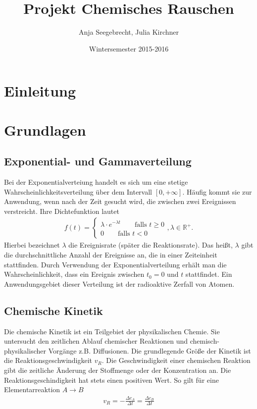 \documentclass{scrartcl}
\title{Projekt Chemisches Rauschen}
\author{Anja Seegebrecht, Julia Kirchner}
\date{Wintersemester 2015-2016}
\begin{document}
\maketitle

\newpage

\tableofcontents

\newpage

\section{Einleitung}


\section{Grundlagen}
\subsection{Exponential- und Gammaverteilung}
Bei der Exponentialverteiung handelt es sich um eine stetige Wahrscheinlichkeitsverteilung über dem Intervall $[0, +\infty]$. Häufig kommt sie zur Anwendung, wenn nach der Zeit gesucht wird, die zwischen zwei Ereignissen verstreicht.
Ihre Dichtefunktion lautet
\begin{align*}
    f(t) = \begin{cases} \lambda \cdot e^{-\lambda t} \qquad \text{falls } t \geq 0 \\ 0 \qquad \text{falls } t < 0 \end{cases}, \lambda \in \mathbb{R}^+.
\end{align*}
Hierbei bezeichnet $\lambda$ die Ereignisrate (später die Reaktionsrate). Das heißt, $\lambda$ gibt die durchschnittliche Anzahl der Ereignisse an, die in einer Zeiteinheit stattfinden. Durch Verwendung der Exponentialverteilung erhält man die Wahrscheinlichkeit, dass ein Ereignis zwischen $t_0=0$ und $t$ stattfindet. Ein Anwendungsgebiet dieser Verteilung ist der radioaktive Zerfall von Atomen. %
\subsection{Chemische Kinetik}
Die chemische Kinetik ist ein Teilgebiet der physikalischen Chemie. Sie untersucht den zeitlichen Ablauf chemischer Reaktionen und chemisch-physikalischer Vorgänge z.B. Diffusionen. Die grundlegende Größe der Kinetik ist die Reaktionsgeschwindigkeit $v_R$. Die Geschwindigkeit einer chemischen Reaktion gibt die zeitliche Änderung der Stoffmenge oder der Konzentration an.
Die Reaktionsgeschindigkeit hat stets einen positiven Wert.
So gilt für eine Elementarreaktion  $A \rightarrow B$
\begin{align*}
     v_R = - \frac{\Delta c_A}{\Delta t} = \frac{\Delta c_B}{\Delta t}
\end{align*}
 
\end{document}
